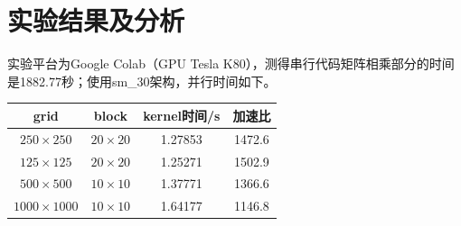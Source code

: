 \documentclass[10pt,letterpaper]{ctexart}
\begin{document}
\section{实验结果及分析}
实验平台为Google Colab（GPU Tesla K80），测得串行代码矩阵相乘部分的时间是1882.77秒；使用sm\_30架构，并行时间如下。
\begin{table}[!htbp]
    \centering
    \begin{tabular}{cc|cc}
        \toprule
        grid & block & kernel时间/s & 加速比\\
        \hline
        $250 \times 250$ & $20 \times 20$ & 1.27853 & 1472.6\\
        $125 \times 125$ & $20 \times 20$ & 1.25271 & 1502.9\\
        $500 \times 500$ & $10 \times 10$ & 1.37771 & 1366.6\\
        $1000 \times 1000$ & $10 \times 10$ & 1.64177 & 1146.8\\
        \bottomrule
    \end{tabular}
\end{table}
\end{document}
